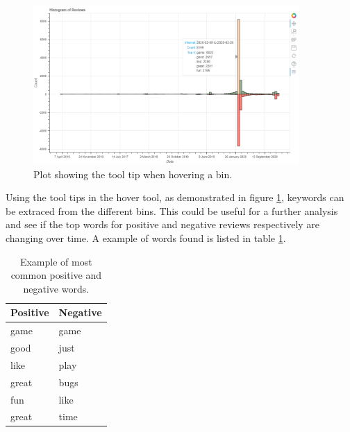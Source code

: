 \begin{figure}[h]
    \caption{Plot showing the tool tip when hovering a bin.}
    \label{fig:hover-tool}
    \centering
    \includegraphics[width=0.9\textwidth]{../plots/demo.png}
\end{figure}

Using the tool tips in the hover tool, as demonstrated in figure \ref{fig:hover-tool}, keywords can be extraced from the different bins. 
This could be useful for a further analysis and see if the top words for positive and negative reviews respectively are changing over time. 
A example of words found is listed in table \ref{tab:words}.


\begin{table}[H]
    \centering
    \caption{Example of most common positive and negative words.}
    \label{tab:words}
    \begin{tabular}{@{}ll@{}}
    \toprule
    Positive & Negative \\ \midrule
    game     & game     \\
    good     & just     \\
    like     & play     \\
    great    & bugs     \\
    fun      & like     \\
    great    & time     \\ \bottomrule
    \end{tabular}
\end{table}